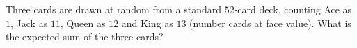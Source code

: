 Three cards are drawn at random from a standard $52$-card deck, counting Ace as $1$, Jack as $11$, Queen as $12$ and King as $13$ (number cards at face value). What is the expected sum of the three cards?
